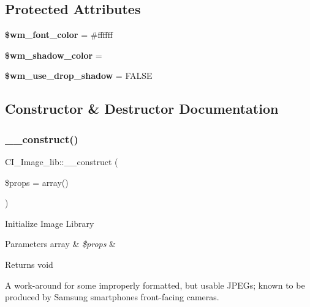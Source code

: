 \subsection*{Protected Attributes}
\begin{DoxyCompactItemize}
\item 
\mbox{\label{class_c_i___image__lib_aa859fe5baf4ca717b002e282f791de22}} 
{\bfseries \$wm\+\_\+font\+\_\+color} = \textquotesingle{}\#ffffff\textquotesingle{}
\item 
\mbox{\label{class_c_i___image__lib_aa51b957521af2ef8eefd4c8fb99c1d6d}} 
{\bfseries \$wm\+\_\+shadow\+\_\+color} = \textquotesingle{}\textquotesingle{}
\item 
\mbox{\label{class_c_i___image__lib_a7bfe1d4b243f9a81d9c27dac06a3a5c9}} 
{\bfseries \$wm\+\_\+use\+\_\+drop\+\_\+shadow} = F\+A\+L\+SE
\end{DoxyCompactItemize}


\subsection{Constructor \& Destructor Documentation}
\mbox{\label{class_c_i___image__lib_a2f6b1d07307457bbe319c5b69aadeb31}} 
\subsubsection{\texorpdfstring{\+\_\+\+\_\+construct()}{\_\_construct()}}
{\footnotesize\ttfamily C\+I\+\_\+\+Image\+\_\+lib\+::\+\_\+\+\_\+construct (\begin{DoxyParamCaption}\item[{}]{\$props = {\ttfamily array()} }\end{DoxyParamCaption})}

Initialize Image Library


\begin{DoxyParams}[1]{Parameters}
array & {\em \$props} & \\
\hline
\end{DoxyParams}
\begin{DoxyReturn}{Returns}
void 
\end{DoxyReturn}
A work-\/around for some improperly formatted, but usable J\+P\+E\+Gs; known to be produced by Samsung smartphones\textquotesingle{} front-\/facing cameras.

